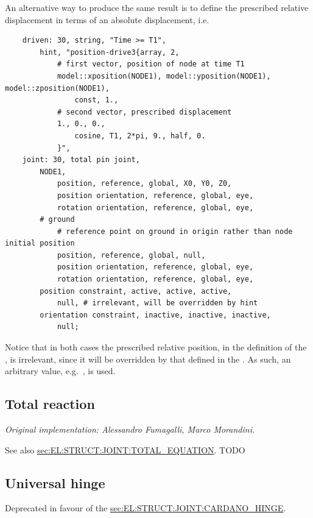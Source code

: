 An alternative way to produce the same result is to define the prescribed relative displacement in terms of an absolute displacement, i.e.
\begin{verbatim}
    driven: 30, string, "Time >= T1",
        hint, "position-drive3{array, 2,
            # first vector, position of node at time T1
            model::xposition(NODE1), model::yposition(NODE1), model::zposition(NODE1),
                const, 1.,
            # second vector, prescribed displacement
            1., 0., 0.,
                cosine, T1, 2*pi, 9., half, 0.
            }",
    joint: 30, total pin joint,
        NODE1,
            position, reference, global, X0, Y0, Z0,
            position orientation, reference, global, eye,
            rotation orientation, reference, global, eye,
        # ground
            # reference point on ground in origin rather than node initial position
            position, reference, global, null,
            position orientation, reference, global, eye,
            rotation orientation, reference, global, eye,
        position constraint, active, active, active,
            null, # irrelevant, will be overridden by hint
        orientation constraint, inactive, inactive, inactive,
            null;
\end{verbatim}
Notice that in both cases the prescribed relative position, in the definition of the ,
is irrelevant, since it will be overridden by that defined in the .
As such, an arbitrary value, e.g.\ , is used.



\subsection{Total reaction}
\label{sec:EL:STRUCT:JOINT:TOTAL_REACTION}
\emph{Original implementation: Alessandro Fumagalli, Marco Morandini.}

See also 
\hyperref{\kw{total equation}}{\kw{total equation} (see Section~}{)}{sec:EL:STRUCT:JOINT:TOTAL_EQUATION}.
TODO




\subsection{Universal hinge}
\label{sec:EL:STRUCT:JOINT:UNIVERSAL_HINGE}
Deprecated in favour of the
\hyperref{\kw{Cardano hinge}}{\kw{Cardano hinge} (see Section~}{)}{sec:EL:STRUCT:JOINT:CARDANO_HINGE}.



